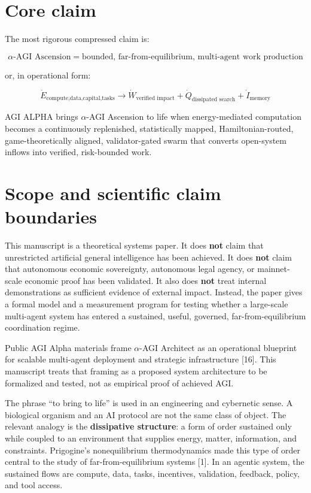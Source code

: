 \documentclass[
  11pt,
]{article}
\begin{document}
\section{Core claim}\label{core-claim}

The most rigorous compressed claim is:

\[
\boxed{
\alpha\text{-AGI Ascension}
=
\text{bounded, far-from-equilibrium, multi-agent work production}
}
\]

or, in operational form:

\[
\boxed{
\dot{E}_{\text{compute,data,capital,tasks}}
\rightarrow
\dot{W}_{\text{verified impact}}
+
\dot{Q}_{\text{dissipated search}}
+
\dot{I}_{\text{memory}}
}
\]

AGI ALPHA brings $\alpha$-AGI Ascension to life when energy-mediated
computation becomes a continuously replenished, statistically mapped,
Hamiltonian-routed, game-theoretically aligned, validator-gated swarm
that converts open-system inflows into verified, risk-bounded work.

\section{Scope and scientific claim
boundaries}\label{scope-and-scientific-claim-boundaries}

This manuscript is a theoretical systems paper. It does \textbf{not}
claim that unrestricted artificial general intelligence has been
achieved. It does \textbf{not} claim that autonomous economic
sovereignty, autonomous legal agency, or mainnet-scale economic proof
has been validated. It also does \textbf{not} treat internal
demonstrations as sufficient evidence of external impact. Instead, the
paper gives a formal model and a measurement program for testing whether
a large-scale multi-agent system has entered a sustained, useful,
governed, far-from-equilibrium coordination regime.

Public AGI Alpha materials frame $\alpha$-AGI Architect as an operational
blueprint for scalable multi-agent deployment and strategic
infrastructure {[}16{]}. This manuscript treats that framing as a
proposed system architecture to be formalized and tested, not as
empirical proof of achieved AGI.

The phrase ``to bring to life'' is used in an engineering and cybernetic
sense. A biological organism and an AI protocol are not the same class
of object. The relevant analogy is the \textbf{dissipative structure}: a
form of order sustained only while coupled to an environment that
supplies energy, matter, information, and constraints. Prigogine's
nonequilibrium thermodynamics made this type of order central to the
study of far-from-equilibrium systems {[}1{]}. In an agentic system, the
sustained flows are compute, data, tasks, incentives, validation,
feedback, policy, and tool access.
\end{document}
